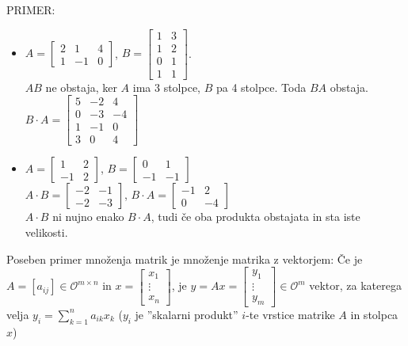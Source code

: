 \documentclass[a4paper,12pt]{article}
\begin{document}
PRIMER:
\begin{itemize}
	\item $A = 
	\begin{bmatrix}
		2&1&4\\
		1&-1&0
	\end{bmatrix}$, $B=
	\begin{bmatrix}
		1&3\\
		1&2\\
		0&1\\
		1&1
	\end{bmatrix}$. \\
	
	$AB$ ne obstaja, ker $A$ ima 3 stolpce, $B$ pa 4 stolpce. Toda $BA$ obstaja. \\

	$B\cdot A=
	\begin{bmatrix}
		5&-2&4\\
		0&-3&-4\\
		1&-1&0\\
		3&0&4
	\end{bmatrix}$

	\item $A= \begin{bmatrix}
		1&2\\
		-1&2
	\end{bmatrix}$, $B=\begin{bmatrix}
		0&1\\
		-1&-1
	\end{bmatrix}$ \\

	$A\cdot B=\begin{bmatrix}
		-2&-1 \\
		-2&-3
	\end{bmatrix}$, $B\cdot A=\begin{bmatrix}
		-1&2\\
		0&-4
	\end{bmatrix}$ \\

	$A\cdot B$ ni nujno enako $B\cdot A$, tudi če oba produkta obstajata in sta iste velikosti. \\
\end{itemize}

Poseben primer množenja matrik je množenje matrika z vektorjem: Če je $A=[a_{ij}]\in \mathcal{O}^{m\times n}$ in $x=\begin{bmatrix} x_1 \\ \vdots \\ x_n \end{bmatrix}$, je $y=Ax=\begin{bmatrix} y_1 \\ \vdots \\ y_m \end{bmatrix} \in \mathcal{O}^m$ vektor, za katerega velja $y_i=\sum_{k=1}^n a_{ik}x_k$ ($y_i$ je ''skalarni produkt'' $i$-te vrstice matrike $A$ in stolpca $x$) \\
\end{document}
